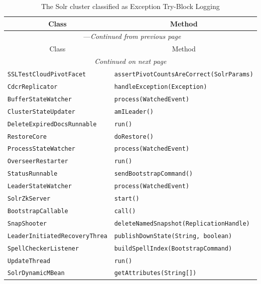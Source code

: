 \begin{center}
\begin{longtable}{ll}
\caption{The Solr cluster classified as Exception Try-Block Logging}\\
\toprule\multicolumn{1}{c}{Class}&\multicolumn{1}{c}{Method}\\\midrule
\endfirsthead

\multicolumn{2}{c}{\tablename\ \thetable{}---\textit{Continued from previous page}} \\\midrule
\multicolumn{1}{c}{Class}&\multicolumn{1}{c}{Method}\\\midrule
\endhead
\multicolumn{2}{c}{\textit{Continued on next page}}\\\midrule
\endfoot
\bottomrule
\endlastfoot

\lstinline/SSLTestCloudPivotFacet/&{\lstinline/assertPivotCountsAreCorrect(SolrParams)/}\\
\lstinline/CdcrReplicator/&{\lstinline/handleException(Exception)/}\\
\lstinline/BufferStateWatcher/&{\lstinline/process(WatchedEvent)/}\\
\lstinline/ClusterStateUpdater/&{\lstinline/amILeader()/}\\
\lstinline/DeleteExpiredDocsRunnable/&{\lstinline/run()/}\\
\lstinline/RestoreCore/&{\lstinline/doRestore()/}\\
\lstinline/ProcessStateWatcher/&{\lstinline/process(WatchedEvent)/}\\
\lstinline/OverseerRestarter/&{\lstinline/run()/}\\
\lstinline/StatusRunnable/&{\lstinline/sendBootstrapCommand()/}\\
\lstinline/LeaderStateWatcher/&{\lstinline/process(WatchedEvent)/}\\
\lstinline/SolrZkServer/&{\lstinline/start()/}\\
\lstinline/BootstrapCallable/&{\lstinline/call()/}\\
\lstinline/SnapShooter/&{\lstinline/deleteNamedSnapshot(ReplicationHandle)/}\\
\lstinline/LeaderInitiatedRecoveryThrea/&{\lstinline/publishDownState(String, boolean)/}\\
\lstinline/SpellCheckerListener/&{\lstinline/buildSpellIndex(BootstrapCommand)/}\\
\lstinline/UpdateThread/&{\lstinline/run()/}\\
\lstinline/SolrDynamicMBean/&{\lstinline/getAttributes(String[])/}\\

\end{longtable}
\end{center}
